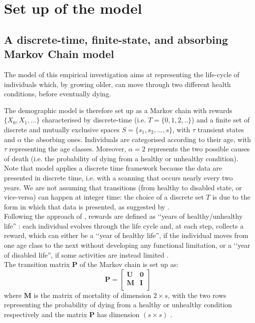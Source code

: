 \documentclass[\main/main.tex]{subfiles}
\begin{document}
\section{Set up of the model}
\subsection{A discrete-time, finite-state, and absorbing\\ Markov Chain model}
The model of this empirical investigation aims at representing the life-cycle of individuals which, by growing older, can move through two different health conditions, before eventually dying.

The demographic model is therefore set up as a Markov chain with rewards $\{X_0, X_1, ...\}$ characterised by discrete-time (i.e. $T = \{ 0,1,2,..\}$) and a finite set of discrete and mutually exclusive spaces $S = \{s_1, s_2, ..., s\}$, with $\tau$ transient states and $\alpha$ the absorbing ones. Individuals are categorised according to their age, with $\tau$ representing the age classes. Moreover, $\alpha = 2$ represents the two possible causes of death (i.e. the probability of dying from a healthy or unhealthy condition).\\ 
Note that model applies a discrete time framework because the data are presented in discrete time, i.e. with a scanning that occurs nearly every two years. We are not assuming that transitions (from healthy to disabled state, or vice-versa) can happen at integer time: the choice of a discrete set $T$ is due to the form in which that data is presented, as suggested by \cite{haberman1999}.\\

Following the approach of \cite{Caswell2018}, rewards are defined as \lq\lq years of healthy/unhealthy life'' : each individual evolves through the life cycle and, at each step, collects a reward, which can either be a \lq\lq year of healthy life'', if the individual moves from one age class to the next without developing any functional limitation, or a \lq\lq year of disabled life'', if some activities are instead limited \citep{Caswell2018}. \\

The transition matrix $\mathbf{P}$ of the Markov chain is set up as:
\begin{equation}
    \mathbf{P} = 
    \begin{bmatrix}
    \mathbf{U} & \mathbf{0}\\
    \mathbf{M} & \mathbf{I}\\
    \end{bmatrix}
    \end{equation}
where $\mathbf{M}$  is the matrix of mortality of dimension $2 \times s$, with the two rows representing the probability of dying from a healthy or unhealthy condition respectively and the matrix $\mathbf{P}$ has dimension $(s \times s)$ \citep{Caswell2018}.
\end{document}
